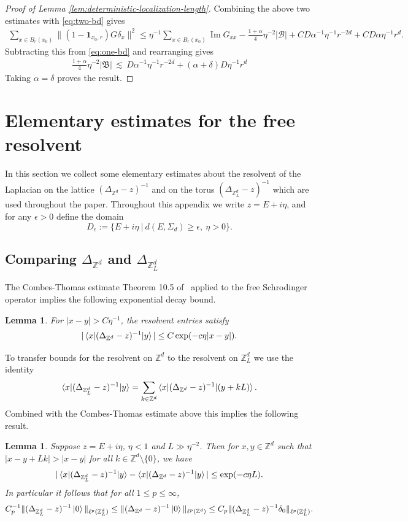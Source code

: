 \documentclass[11pt]{amsart}
\def\bbZ{{\mathbb Z}}
\def\One{{\mathbf{1}}}
\newcommand{\Impt}{\operatorname*{Im}}
\def\lsim{{\,\lesssim\,}}
\def\ket#1{\mathinner{|{#1}\rangle}}
\def\braket#1{\mathinner{\langle{#1}\rangle}}
\numberwithin{equation}{section}
\numberwithin{theorem}{section}
\newtheorem{lemma}[theorem]{Lemma}
\begin{document}
\begin{proof}[Proof of Lemma \ref{lem:deterministic-localization-length}]
Combining the above two estimates with \eqref{eq:two-bd} gives
\begin{align*}
\sum_{x\in B_r(x_0)} \|(1-\One_{x_0,r})G\delta_x\|^2
\leq \eta^{-1}\sum_{x\in B_r(x_0)}\Impt G_{xx} - \frac{1+\alpha}{4}\eta^{-2}|\mathcal{B}| + CD\alpha^{-1}\eta^{-1}r^{-2d} + CD \alpha \eta^{-1}r^d.
\end{align*}
Subtracting this from \eqref{eq:one-bd} and rearranging gives
\begin{align*}
\frac{1+\alpha}{4}\eta^{-2}|\mathfrak{B}|\lsim D\alpha^{-1}\eta^{-1}r^{-2d} + (\alpha+\delta) D\eta^{-1}r^d
\end{align*}
Taking $\alpha = \delta$ proves the result.
\end{proof}


\appendix

\section{Elementary estimates for the free resolvent}

In this section we collect some elementary estimates about the resolvent of
the Laplacian on the lattice $(\Delta_{\bbZ^d}-z)^{-1}$ and on the torus $(\Delta_{\bbZ^d_L}-z)^{-1}$
which are used throughout the paper.  Throughout this appendix we write $z=E+i\eta$, and for any $\epsilon>0$ define the domain
$$D_{\epsilon} := \{E+i\eta\ |\ d(E,\Sigma_d)\geq\epsilon,\ \eta>0 \}.$$

\subsection{Comparing $\Delta_{\bbZ^d}$ and $\Delta_{\bbZ^d_L}$}

The Combes-Thomas estimate Theorem 10.5 of~\cite{aizenman2015random} applied to the free Schrodinger operator implies the following exponential decay bound.
\begin{lemma}
\label{lem:exp-decay}
For $|x-y|>C\eta^{-1}$, the resolvent entries satisfy
\[
|\braket{x|(\Delta_{\bbZ^d} - z)^{-1}|y}| \leq C \exp(-c \eta |x-y|).
\]
\end{lemma}

To transfer bounds for the resolvent on $\bbZ^d$ to the resolvent on $\bbZ^d_L$ we use the identity
\[
\braket{x|(\Delta_{\bbZ^d_L}-z)^{-1}|y}
= \sum_{k\in\bbZ^d} \braket{x|(\Delta_{\bbZ^d}-z)^{-1}|(y+kL)}.
\]
Combined with the Combes-Thomas estimate above this implies the following result.
\begin{lemma}
\label{cor:resolvent-truncation}
Suppose $z= E+i\eta$, $\eta<1$ and $L \gg \eta^{-2}$.
Then for $x,y\in\bbZ^d$ such that $|x-y+Lk| > |x-y|$ for all $k\in\bbZ^d\setminus\{0\}$, we have
\[
|\braket{x|(\Delta_{\bbZ^d_L}-z)^{-1}|y} -
\braket{x|(\Delta_{\bbZ^d}-z)^{-1}|y}| \leq \exp(-c \eta L).
\]
In particular it follows that for all $1\leq p\leq \infty$,
\[
C_p^{-1}\|(\Delta_{\bbZ^d_L}-z)^{-1}\ket{0}\|_{\ell^p(\bbZ^d_L)}\leq \|(\Delta_{\bbZ^d}-z)^{-1}\ket{0}\|_{\ell^p(\bbZ^d)}
\leq C_p
\|(\Delta_{\bbZ^d_L}-z)^{-1}\delta_0\|_{\ell^p(\bbZ^d_L)}.
\]
\end{lemma}
\end{document}
